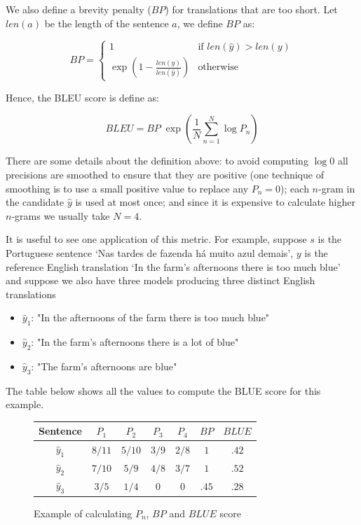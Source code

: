 We also define a brevity penalty ($BP$) for translations that are too short. Let $len(a)$ be the length of the sentence $a$, we define $BP$ as:

\begin{equation}
BP=
\begin{cases}
1 & \text{if } len(\hat{y}) > len(y) \\
\exp\left( 1 - \frac{len(y)}{len(\hat{y})} \right) & \text{otherwise}
\end{cases}
\end{equation} 


Hence, the BLEU score is define as:

\begin{equation}
BLEU = BP \; \exp \left(\frac{1}{N}  \sum_{n=1}^{N} \log P_n \right)
\end{equation}

There are some details about the definition above: to avoid computing $\log 0$ all precisions are smoothed to ensure that they are positive (one technique of smoothing is to use a small positive value to replace any $P_n=0$); each $n$-gram in the candidate $\hat{y}$ is used at most once; and since it is expensive to calculate higher $n$-grams we usually take $N=4$.

It is useful to see one application of this metric. For example, suppose $s$ is the Portuguese sentence `Nas tardes de fazenda há muito azul demais', $y$ is the reference English translation `In the farm's afternoons there is too much blue' and suppose we also have three models producing three distinct English translations 

\begin{itemize}
\item $\hat{y}_1$: "In the afternoons of the farm there is too much blue"
\item $\hat{y}_2$: "In the farm's afternoons there is a lot of blue"
\item $\hat{y}_3$: "The farm's afternoons are blue"
\end{itemize}


The table below shows all the values to compute the BLUE score for this example.

\begin{figure}[h]
\label{bluetable}
\begin{center}
\begin{tabular}{|c|c|c|c|c|c|c|}
\hline
\cellcolor{blue!10} Sentence & \cellcolor{blue!10} $P_1$ & \cellcolor{blue!10} $P_2$ & \cellcolor{blue!10} $P_3$ & \cellcolor{blue!10} $P_4$ & \cellcolor{blue!10} $BP$ & \cellcolor{blue!10} $BLUE$ \\ \hline
\cellcolor{blue!10} $\hat{y}_1$ & $8/11$ & $5/10$ & $3/9$ & $2/8$ & $1$ & $.42$\\ \hline
\cellcolor{blue!10} $\hat{y}_2$ & $7/10$ & $5/9$ & $4/8$ & $3/7$ & $1$ & $.52$\\ \hline
\cellcolor{blue!10} $\hat{y}_3$ & $3/5$ & $1/4$ & $0$ & $0$ & $.45$ & $.28$\\ \hline
\end{tabular}
\end{center}
\caption{Example of calculating $P_n$, $BP$ and $BLUE$ score}
\end{figure}

